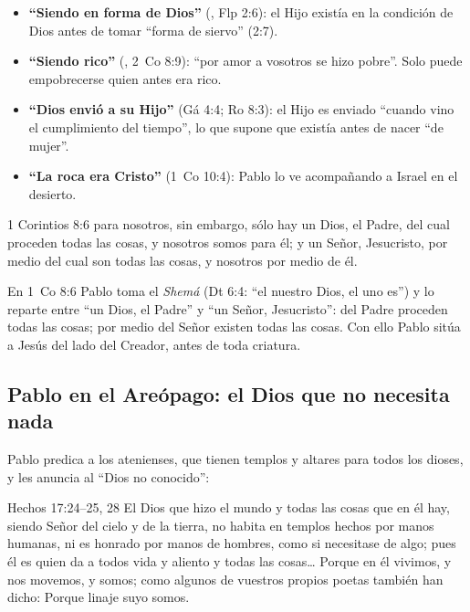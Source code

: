 \begin{itemize}
\item \textbf{``Siendo en forma de Dios''} (, Flp 2:6): el Hijo existía en la condición de Dios antes de tomar ``forma de siervo'' (2:7).
\item \textbf{``Siendo rico''} (, 2~Co 8:9): ``por amor a vosotros se hizo pobre''. Solo puede empobrecerse quien antes era rico.
\item \textbf{``Dios envió a su Hijo''} (Gá 4:4; Ro 8:3): el Hijo es enviado ``cuando vino el cumplimiento del tiempo'', lo que supone que existía antes de nacer ``de mujer''.
\item \textbf{``La roca era Cristo''} (1~Co 10:4): Pablo lo ve acompañando a Israel en el desierto.
\end{itemize}

\begin{verso}{1 Corintios 8:6}
para nosotros, sin embargo, sólo hay un Dios, el Padre, del cual proceden todas las cosas, y nosotros somos para él; y un Señor, Jesucristo, por medio del cual son todas las cosas, y nosotros por medio de él.
\end{verso}

En 1~Co 8:6 Pablo toma el \emph{Shemá} (Dt 6:4: ``el \SENOR{} nuestro Dios, el \SENOR{} uno es'') y lo reparte entre ``un Dios, el Padre'' y ``un Señor, Jesucristo'': del Padre proceden todas las cosas; por medio del Señor existen todas las cosas. Con ello Pablo sitúa a Jesús del lado del Creador, antes de toda criatura.


\subsection{Pablo en el Areópago: el Dios que no necesita nada}
Pablo predica a los atenienses, que tienen templos y altares para todos los dioses, y les anuncia al ``Dios no conocido'':

\begin{verso}{Hechos 17:24–25, 28}
El Dios que hizo el mundo y todas las cosas que en él hay, siendo Señor del cielo y de la tierra, no habita en templos hechos por manos humanas, ni es honrado por manos de hombres, como si necesitase de algo; pues él es quien da a todos vida y aliento y todas las cosas\ldots{} Porque en él vivimos, y nos movemos, y somos; como algunos de vuestros propios poetas también han dicho: Porque linaje suyo somos.
\end{verso}

